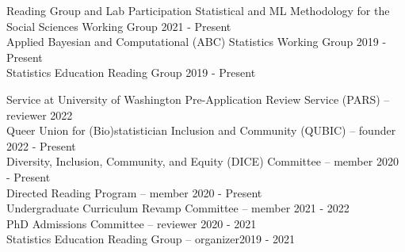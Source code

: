 \documentclass{resume} %
\begin{document}
\begin{rSection}{Reading Group and Lab  Participation}
Statistical and ML Methodology for the Social Sciences Working Group \hfill{2021 - Present}\\
Applied Bayesian and Computational (ABC) Statistics Working Group \hfill {2019 - Present}\\
Statistics Education Reading Group \hfill {2019 - Present}
\end{rSection}

\begin{rSection}{Service at University of Washington}
Pre-Application Review Service (PARS) -- reviewer \hfill{2022}\\
Queer Union for (Bio)statistician Inclusion and Community (QUBIC) -- founder \hfill {2022 - Present}\\
Diversity, Inclusion, Community, and Equity (DICE) Committee -- member \hfill {2020 - Present}\\
Directed Reading Program -- member\hfill{ 2020 - Present}\\
Undergraduate Curriculum Revamp Committee -- member \hfill {2021 - 2022}\\
PhD Admissions Committee -- reviewer \hfill{2020 - 2021}\\
Statistics Education Reading Group -- organizer\hfill{2019 - 2021}


\end{rSection}
\end{document}
